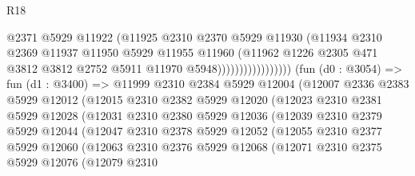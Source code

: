 \begin{lexlean}{R18}
\begin{coremodule}
                                    @2371
                                    @5929
                                    @11922
                                    (@11925
                                      @2310
                                      @2370
                                      @5929
                                      @11930
                                      (@11934
                                        @2310
                                        @2369
                                        @11937
                                        @11950
                                        @5929
                                        @11955
                                        @11960
                                        (@11962
                                          @1226
                                          @2305
                                          @471
                                          @3812
                                          @3812
                                          @2752
                                          @5911
                                          @11970
                                          @5948)))))))))))))))))
        (fun (d0 : @3054) =>
        fun (d1 : @3400) =>
        @11999
          @2310
          @2384
          @5929
          @12004
          (@12007
            @2336
            @2383
            @5929
            @12012
            (@12015
              @2310
              @2382
              @5929
              @12020
              (@12023
                @2310
                @2381
                @5929
                @12028
                (@12031
                  @2310
                  @2380
                  @5929
                  @12036
                  (@12039
                    @2310
                    @2379
                    @5929
                    @12044
                    (@12047
                      @2310
                      @2378
                      @5929
                      @12052
                      (@12055
                        @2310
                        @2377
                        @5929
                        @12060
                        (@12063
                          @2310
                          @2376
                          @5929
                          @12068
                          (@12071
                            @2310
                            @2375
                            @5929
                            @12076
                            (@12079
                              @2310

\end{coremodule}
\end{lexlean}
